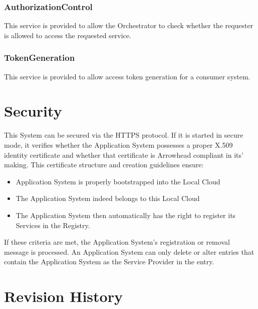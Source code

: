 \documentclass[a4paper]{arrowhead}
\newcommand{\spdef}[2]{{\textcolor{ArrowheadBlue}{#2\label{sec:services:produced:#1}}}}
\begin{document}
\subsubsection{\spdef{AuthorizationControl}{AuthorizationControl}}

This service is provided to allow the Orchestrator to check whether the requester is allowed to access the requested service. 

\subsubsection{\spdef{TokenGeneration}{TokenGeneration}}

This service is provided to allow access token generation for a consumer system.

\section{Security}
\label{sec:security}

This System can be secured via the HTTPS protocol. If it is started in secure mode, it verifies whether the Application System possesses a proper X.509 identity certificate and whether that certificate is Arrowhead compliant in its' making. This certificate structure and creation guidelines ensure:

\begin{itemize}
    \item Application System is properly bootstrapped into the Local Cloud
    \item The Application System indeed belongs to this Local Cloud
    \item The Application System then automatically has the right to register its Services in the Registry.
   
\end{itemize}

 If these criteria are met, the Application System’s registration or removal message is processed. An Application System can only delete or alter entries that contain the Application System as the Service Provider in the entry.



\newpage




\newpage

\section{Revision History}
\end{document}
